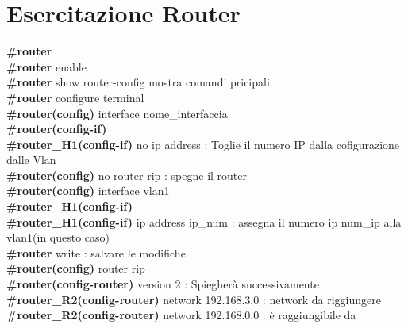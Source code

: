 \documentclass{report}
\begin{document}
    \chapter{Esercitazione Router}
        \textbf{\#router}
        \\
        \textbf{\#router} enable 
        \\
        \textbf{\#router} show router-config mostra comandi pricipali.
        \\
        \textbf{\#router} configure terminal 
        \\
        \textbf{\#router(config)} interface nome\_interfaccia 
        \\
        \textbf{\#router(config-if)}
        \\
        \textbf{\#router\_H1(config-if)} no ip address : Toglie il numero IP dalla cofigurazione dalle Vlan
        \\
       \textbf{\#router(config)} no router rip : spegne il router
        \\
        \textbf{\#router(config)} interface vlan1
        \\
        \textbf{\#router\_H1(config-if)}
        \\
        \textbf{\#router\_H1(config-if)} ip address ip\_num : assegna il numero ip num\_ip alla vlan1(in questo caso)
        \\
        \textbf{\#router} write : salvare le modifiche
        \\
        \textbf{\#router(config)} router rip
        \\
        \textbf{\#router(config-router)} version 2 : Spiegherà successivamente
         \\
        \textbf{\#router\_R2(config-router)} network 192.168.3.0 : network da riggiungere
         \\
        \textbf{\#router\_R2(config-router)} network 192.168.0.0 : è raggiungibile da

        
\end{document}

